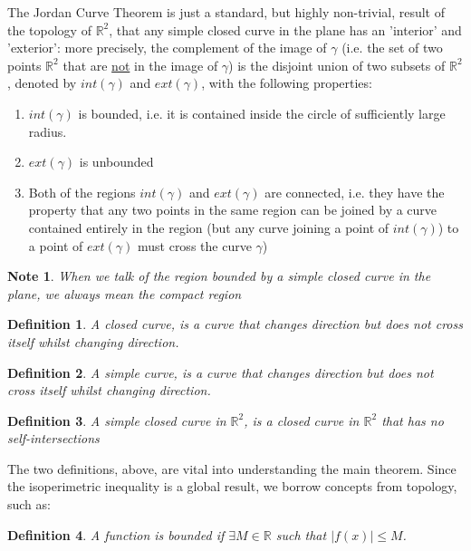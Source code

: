 \documentclass[a4paper]{book}
\newtheorem*{note*}{Note}%
\newtheorem{definition}{Definition}%
\begin{document}
The Jordan Curve Theorem is just a standard, but highly non-trivial, result of the topology of $\mathbb{R}^2$, that any simple closed curve in the plane has an 'interior' and 'exterior': more precisely, the complement of the image of $\gamma$ (i.e. the set of two points $\mathbb{R}^2$ that are \underline{not} in the image of $\gamma$) is the disjoint union of two subsets of $\mathbb{R}^2$, denoted by $int(\gamma)$ and $ext(\gamma)$, with the following properties:
\begin{enumerate}
    \item $int(\gamma)$ is bounded, i.e. it is contained inside the circle of sufficiently large radius.
    \item $ext(\gamma)$ is unbounded
    \item Both of the regions $int(\gamma)$ and $ext(\gamma)$ are connected, i.e. they have the property that any two points in the same region can be joined by a curve contained entirely in the region (but any curve joining a point of $int(\gamma)$) to a point of $ext(\gamma)$ must cross the curve $\gamma$)
\end{enumerate}


\begin{note*} 
    When we talk of the region bounded by a simple closed curve in the plane, we always mean the compact region
\end{note*}

\begin{definition}
    A closed curve, is a curve that changes direction but does not cross itself whilst changing direction.
\end{definition}

\begin{definition}
    A simple curve, is a curve that changes direction but does not cross itself whilst changing direction.
\end{definition}

\begin{definition}
    A simple closed curve in $\mathbb{R}^2$, is a closed curve in $\mathbb{R}^2$ that has no self-intersections
\end{definition}

The two definitions, above, are vital into understanding the main theorem. Since the isoperimetric inequality is a global result, we borrow concepts from topology, such as:

\begin{definition}
    A function is bounded if $\exists M \in \mathbb{R}$ such that $\left| f(x) \right| \leq M$.
\end{definition}
\end{document}
